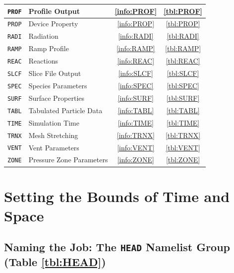 \documentclass[11pt]{book}
\newcommand{\ct}{\tt\small}
\begin{document}
\begin{table}[ht]
\begin{center}
\begin{tabular}{|c|l|c|c|}
{\ct PROF}  & Profile Output               & \ref{info:PROF} & \ref{tbl:PROF}  \\ \hline
{\ct PROP}  & Device Property              & \ref{info:PROP} & \ref{tbl:PROP}  \\ \hline
{\ct RADI}  & Radiation                    & \ref{info:RADI} & \ref{tbl:RADI}  \\ \hline
{\ct RAMP}  & Ramp Profile                 & \ref{info:RAMP} & \ref{tbl:RAMP}  \\ \hline
{\ct REAC}  & Reactions                    & \ref{info:REAC} & \ref{tbl:REAC}  \\ \hline
{\ct SLCF}  & Slice File Output            & \ref{info:SLCF} & \ref{tbl:SLCF}  \\ \hline
{\ct SPEC}  & Species Parameters           & \ref{info:SPEC} & \ref{tbl:SPEC}  \\ \hline
{\ct SURF}  & Surface Properties           & \ref{info:SURF} & \ref{tbl:SURF}  \\ \hline
{\ct TABL}  & Tabulated Particle Data      & \ref{info:TABL} & \ref{tbl:TABL}  \\ \hline
{\ct TIME}  & Simulation Time              & \ref{info:TIME} & \ref{tbl:TIME}  \\ \hline
{\ct TRNX}  & Mesh Stretching              & \ref{info:TRNX} & \ref{tbl:TRNX}  \\ \hline
{\ct VENT}  & Vent Parameters              & \ref{info:VENT} & \ref{tbl:VENT}  \\ \hline
{\ct ZONE}  & Pressure Zone Parameters     & \ref{info:ZONE} & \ref{tbl:ZONE}  \\ \hline
\end{tabular}
\end{center}
\end{table}


\clearpage

\chapter{Setting the Bounds of Time and Space}


\section{Naming the Job: The \texorpdfstring{{\tt HEAD}}{HEAD} Namelist Group (Table \ref{tbl:HEAD})}
\label{info:HEAD}
\end{document}
